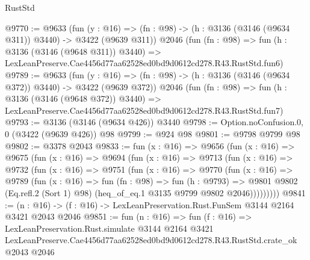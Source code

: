 \begin{lexlean}{RustStd}
\begin{coremodule}
@9770 := @9633
    (fun (y : @16) => (fn : @98) -> (h : @3136 (@3146 (@9634 @311)) @3440) -> @3422 (@9639 @311))
    @2046
    (fun (fn : @98) =>
    fun (h : @3136 (@3146 (@9648 @311)) @3440) =>
    LexLeanPreserve.Cae4456d77aa62528ed0bd9d0612cd278.R43.RustStd.fun6)
@9789 := @9633
    (fun (y : @16) => (fn : @98) -> (h : @3136 (@3146 (@9634 @372)) @3440) -> @3422 (@9639 @372))
    @2046
    (fun (fn : @98) =>
    fun (h : @3136 (@3146 (@9648 @372)) @3440) =>
    LexLeanPreserve.Cae4456d77aa62528ed0bd9d0612cd278.R43.RustStd.fun7)
@9793 := @3136 (@3146 (@9634 @426)) @3440
@9798 := Option.noConfusion.{0, 0} (@3422 (@9639 @426)) @98
@9799 := @924 @98
@9801 := @9798 @9799 @98
@9802 := @3378 @2043
@9833 := fun (x : @16) =>
  @9656
    (fun (x : @16) =>
    @9675
      (fun (x : @16) =>
      @9694
        (fun (x : @16) =>
        @9713
          (fun (x : @16) =>
          @9732
            (fun (x : @16) =>
            @9751
              (fun (x : @16) =>
              @9770
                (fun (x : @16) =>
                @9789
                  (fun (x : @16) =>
                  fun (fn : @98) =>
                  fun (h : @9793) =>
                  @9801
                    @9802
                    (Eq.refl.{2} (Sort 1) @98)
                    (heq_of_eq.{1} @3135 @9799 @9802 @2046)))))))))
@9841 := (n : @16) -> (f : @16) -> LexLeanPreservation.Rust.FunSem @3144 @2164 @3421 @2043 @2046
@9851 := fun (n : @16) =>
  fun (f : @16) =>
  LexLeanPreservation.Rust.simulate
    @3144
    @2164
    @3421
    LexLeanPreserve.Cae4456d77aa62528ed0bd9d0612cd278.R43.RustStd.crate_ok
    @2043
    @2046
\end{coremodule}
\end{lexlean}
